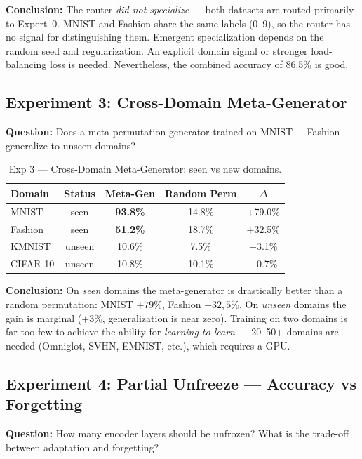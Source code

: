 \documentclass[11pt,a4paper]{report}
\begin{document}
\textbf{Conclusion:} The router \emph{did not specialize} --- both datasets are routed primarily
to Expert~0. MNIST and Fashion share the same labels (0--9), so the router has no signal
for distinguishing them. Emergent specialization depends on the random seed
and regularization. An explicit domain signal or stronger load-balancing loss is needed.
Nevertheless, the combined accuracy of 86.5\% is good.

\subsection{Experiment 3: Cross-Domain Meta-Generator}

\textbf{Question:} Does a meta permutation generator trained on MNIST + Fashion generalize to unseen domains?

\begin{table}[h!]
\centering
\caption{Exp 3 --- Cross-Domain Meta-Generator: seen vs new domains.}
\begin{tabular}{l c c c c}
\hline
\textbf{Domain} & \textbf{Status} & \textbf{Meta-Gen} & \textbf{Random Perm} & \textbf{$\Delta$} \\
\hline
MNIST & seen & \textbf{93.8\%} & 14.8\% & +79.0\% \\
Fashion & seen & \textbf{51.2\%} & 18.7\% & +32.5\% \\
KMNIST & unseen & 10.6\% & 7.5\% & +3.1\% \\
CIFAR-10 & unseen & 10.8\% & 10.1\% & +0.7\% \\
\hline
\end{tabular}
\label{tab:cpu_exp3}
\end{table}

\textbf{Conclusion:} On \emph{seen} domains the meta-generator is drastically better than a random
permutation: MNIST $+79\%$, Fashion $+32{,}5\%$. On \emph{unseen} domains
the gain is marginal ($+3\%$, generalization is near zero).
Training on two domains is far too few to achieve the ability
for \emph{learning-to-learn} --- 20--50+ domains are needed (Omniglot, SVHN, EMNIST, etc.),
which requires a GPU.

\subsection{Experiment 4: Partial Unfreeze --- Accuracy vs Forgetting}

\textbf{Question:} How many encoder layers should be unfrozen? What is the trade-off between adaptation and forgetting?
\end{document}

